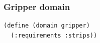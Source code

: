 \documentclass{beamer}
\begin{document}
\begin{frame}[containsverbatim]
\frametitle{Gripper domain}
\begin{lstlisting}
(define (domain gripper)
  (:requirements :strips))
\end{lstlisting}
\end{frame}
\end{document}
